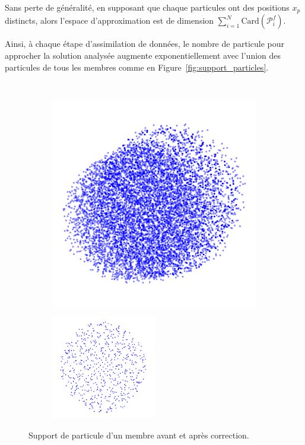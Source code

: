 Sans perte de généralité, en supposant que chaque particules ont des positions $x_p$ distincts, alors l'espace d'approximation est de dimension $\sum_{i=1}^{N} \text{Card}(\mathcal{P}^f_i)$.

Ainsi, à chaque étape d'assimilation de données, le nombre de particule pour approcher la solution analysée augmente exponentiellement avec l'union des particules de tous les membres comme en Figure~\ref{fig:support_particles}.

\begin{figure}~\label{fig:support_particles}
    \centering
    \begin{subfigure}{0.5\textwidth}
        \includegraphics[width=\textwidth]{images/all_particles.pdf}
    \end{subfigure}
    \begin{subfigure}{0.5\textwidth}
        \includegraphics[width=0.5\textwidth]{images/memb_particles.pdf}
    \end{subfigure}
    \caption{Support de particule d'un membre avant et après correction.}
\end{figure}

